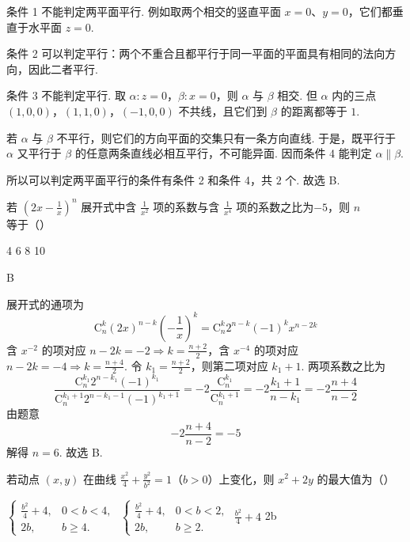 \begin{solution}
条件 1 不能判定两平面平行. 例如取两个相交的竖直平面 \(x=0\)、\(y=0\)，它们都垂直于水平面 \(z=0\).

条件 2 可以判定平行：两个不重合且都平行于同一平面的平面具有相同的法向方向，因此二者平行.

条件 3 不能判定平行. 取 \(\alpha:z=0\)，\(\beta:x=0\)，则 \(\alpha\) 与 \(\beta\) 相交. 但 \(\alpha\) 内的三点 \((1,0,0)\)，\((1,1,0)\)，\((-1,0,0)\) 不共线，且它们到 \(\beta\) 的距离都等于 \(1\).

若 \(\alpha\) 与 \(\beta\) 不平行，则它们的方向平面的交集只有一条方向直线. 于是，既平行于 \(\alpha\) 又平行于 \(\beta\) 的任意两条直线必相互平行，不可能异面. 因而条件 4 能判定 \(\alpha\parallel\beta\).

所以可以判定两平面平行的条件有条件 2 和条件 4，共 \(2\) 个. 故选 B.
\end{solution}

\begin{problem}
若 \(\left(2x - \frac{1}{x}\right)^n\) 展开式中含 \(\frac{1}{x^2}\) 项的系数与含 \(\frac{1}{x^4}\) 项的系数之比为\(-5\)，则 \(n\) 等于（\quad）

\choices
    {4}
    {6}
    {8}
    {10}
\end{problem}

\begin{answer}
B
\end{answer}

\begin{solution}
展开式的通项为
\[
\mathrm C_n^k(2x)^{n-k}\left(-\frac1x\right)^k
=\mathrm C_n^k2^{n-k}(-1)^k x^{n-2k}
\]
含 \(x^{-2}\) 的项对应 \(n-2k=-2\Longrightarrow k=\frac{n+2}{2}\)，含 \(x^{-4}\) 的项对应 \(n-2k=-4\Longrightarrow k=\frac{n+4}{2}\).
令 \(k_1=\frac{n+2}{2}\)，则第二项对应 \(k_1+1\). 两项系数之比为
\[
\frac{\mathrm C_n^{k_1}2^{n-k_1}(-1)^{k_1}}
{\mathrm C_n^{k_1+1}2^{n-k_1-1}(-1)^{k_1+1}}
=-2\frac{\mathrm C_n^{k_1}}{\mathrm C_n^{k_1+1}}
=-2\frac{k_1+1}{n-k_1}
=-2\frac{n+4}{n-2}
\]
由题意
\[
-2\frac{n+4}{n-2}=-5
\]
解得 \(n=6\). 故选 B.
\end{solution}

\begin{problem}
若动点 \((x, y)\) 在曲线 \(\frac{x^2}{4} + \frac{y^2}{b^2} = 1\)（\(b > 0\)）上变化，则 \(x^2 + 2y\) 的最大值为（\quad）

\choices
    {\(\begin{cases}
\frac{b^2}{4} + 4, & 0 < b < 4,\\
2b, & b \geqslant 4.
\end{cases}\)}
    {\(\begin{cases}
\frac{b^2}{4} + 4, & 0 < b < 2,\\
2b, & b \geqslant 2.
\end{cases}\)}
    {\( \frac{b^{2}}{4} + 4 \)}
    {2b}
\end{problem}

